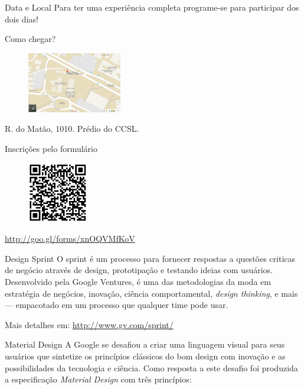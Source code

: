 \documentclass[final]{beamer} %
\begin{document}
\begin{frame}{}
\begin{block}{\large Data e Local}
        Para ter uma experiência completa programe-se para participar dos dois dias!
    \end{block}
    \begin{minipage}{0.482\linewidth}
      \begin{block}{\large Como chegar?}
        \center
        \begin{figure}[h]
          \includegraphics[height=100px]{ccsl-location}
        \end{figure}
        R. do Matão, 1010. Prédio do CCSL.
      \end{block}
    \end{minipage}
    \begin{minipage}{0.49\linewidth}
      \begin{block}{\large Inscrições pelo formulário}
        \center
        \begin{figure}[h]
          \includegraphics[height=100px]{design_sprint_form_qr}
        \end{figure}

        \url{http://goo.gl/forms/xnOQVMfKoV}
      \end{block}
    \end{minipage}
    \vfill
    \begin{block}{\large Design Sprint}
      O sprint é um processo para fornecer respostas a questões criticas de negócio através de design, prototipação e testando ideias com usuários. Desenvolvido pela Google Ventures, é uma das metodologias da moda em estratégia de negócios, inovação, ciência comportamental, \textit{design thinking}, e mais — empacotado em um processo que qualquer time pode usar.

      Mais detalhes em: \url{http://www.gv.com/sprint/}
    \end{block}
    \vfill
    \begin{block}{\large Material Design}
      A Google se desafiou a criar uma linguagem visual para seus usuários que sintetize os princípios clássicos do bom design com inovação e as possibilidades da tecnologia e ciência. Como resposta a este desafio foi produzida a especificação \textit{Material Design} com três princípios:


\end{block}
\end{frame}
\end{document}
